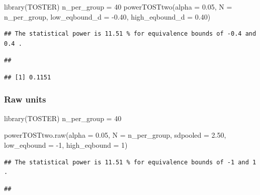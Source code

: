 \documentclass[
]{krantz}
\makeatletter
\newenvironment{Shaded}{\begin{snugshade}}{\end{snugshade}}
\newcommand{\AttributeTok}[1]{\textcolor[rgb]{0.61,0.61,0.61}{#1}}
\newcommand{\DecValTok}[1]{\textcolor[rgb]{0.06,0.06,0.06}{#1}}
\newcommand{\FloatTok}[1]{\textcolor[rgb]{0.06,0.06,0.06}{#1}}
\newcommand{\FunctionTok}[1]{\textcolor[rgb]{0,0,0}{#1}}
\newcommand{\NormalTok}[1]{#1}
\newcommand{\OtherTok}[1]{\textcolor[rgb]{0.37,0.37,0.37}{#1}}
\newcommand{\SpecialCharTok}[1]{\textcolor[rgb]{0,0,0}{#1}}
\newenvironment{kframe}{%
\medskip{}
\setlength{\fboxsep}{.8em}
 \def\at@end@of@kframe{}%
 \ifinner\ifhmode%
  \def\at@end@of@kframe{\end{minipage}}%
  \begin{minipage}{\columnwidth}%
 \fi\fi%
 \def\FrameCommand##1{\hskip\@totalleftmargin \hskip-\fboxsep
 \colorbox{shadecolor}{##1}\hskip-\fboxsep
     \hskip-\linewidth \hskip-\@totalleftmargin \hskip\columnwidth}%
 \MakeFramed {\advance\hsize-\width
   \@totalleftmargin\z@ \linewidth\hsize
   \@setminipage}}%
 {\par\unskip\endMakeFramed%
 \at@end@of@kframe}
\renewenvironment{Shaded}{\begin{kframe}}{\end{kframe}}
\makeatother
\begin{document}
\begin{Shaded}
\begin{Highlighting}[]
\FunctionTok{library}\NormalTok{(TOSTER)}
\NormalTok{n\_per\_group }\OtherTok{=} \DecValTok{40}
\FunctionTok{powerTOSTtwo}\NormalTok{(}\AttributeTok{alpha =} \FloatTok{0.05}\NormalTok{,}
             \AttributeTok{N  =}\NormalTok{ n\_per\_group,}
             \AttributeTok{low\_eqbound\_d =} \SpecialCharTok{{-}}\FloatTok{0.40}\NormalTok{,}
             \AttributeTok{high\_eqbound\_d =} \FloatTok{0.40}\NormalTok{)}
\end{Highlighting}
\end{Shaded}

\begin{verbatim}
## The statistical power is 11.51 % for equivalence bounds of -0.4 and 0.4 .
\end{verbatim}

\begin{verbatim}
## 
\end{verbatim}

\begin{verbatim}
## [1] 0.1151
\end{verbatim}

\hypertarget{raw-units-4}{%
\subsubsection{Raw units}\label{raw-units-4}}

\begin{Shaded}
\begin{Highlighting}[]
\FunctionTok{library}\NormalTok{(TOSTER)}
\NormalTok{n\_per\_group }\OtherTok{=} \DecValTok{40}

\FunctionTok{powerTOSTtwo.raw}\NormalTok{(}\AttributeTok{alpha =} \FloatTok{0.05}\NormalTok{,}
                 \AttributeTok{N  =}\NormalTok{ n\_per\_group,}
                 \AttributeTok{sdpooled =} \FloatTok{2.50}\NormalTok{,}
                 \AttributeTok{low\_eqbound =} \SpecialCharTok{{-}}\DecValTok{1}\NormalTok{,}
                 \AttributeTok{high\_eqbound =} \DecValTok{1}\NormalTok{)}
\end{Highlighting}
\end{Shaded}

\begin{verbatim}
## The statistical power is 11.51 % for equivalence bounds of -1 and 1 .
\end{verbatim}

\begin{verbatim}
## 
\end{verbatim}
\end{document}
